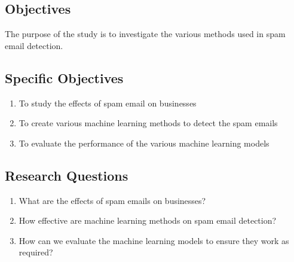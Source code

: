 \subsection{Objectives}
The purpose of the study is to investigate the various methods used in spam email detection.

\subsection{Specific Objectives}
\begin{enumerate}[label=\roman*]
    \item To study the effects of spam email on businesses
    \item To create various machine learning methods to detect the spam emails
    \item To evaluate the performance of the various machine learning models
\end{enumerate}

\subsection{Research Questions}
\begin{enumerate}[label=\roman*]
    \item What are the effects of spam emails on businesses?
    \item How effective are machine learning methods on spam email detection?
    \item How can we evaluate the machine learning models to ensure they work as required?
\end{enumerate}